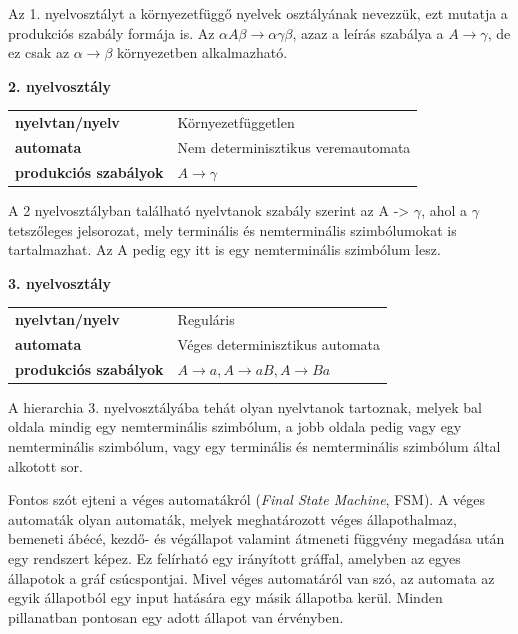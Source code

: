 \medskip

Az 1. nyelvosztályt a környezetfüggő nyelvek osztályának nevezzük, ezt mutatja a produkciós szabály formája is.
Az $\alpha A \beta \rightarrow \alpha \gamma \beta$, azaz a leírás szabálya a $A \rightarrow \gamma$, de ez csak az $\alpha \rightarrow \beta$ környezetben alkalmazható.

\bigskip

\noindent \textbf{2. nyelvosztály}

\medskip

\begin{tabular}{ll}
\textbf{nyelvtan/nyelv} & Környezetfüggetlen \\
\textbf{automata} & Nem determinisztikus veremautomata \\
\textbf{produkciós szabályok} & $A \rightarrow \gamma$ \\
\end{tabular}

\medskip

A 2 nyelvosztályban található nyelvtanok szabály szerint az A -> $\gamma$, ahol a $\gamma$ tetszőleges jelsorozat, mely terminális és nemterminális szimbólumokat is tartalmazhat. Az A pedig egy itt is egy nemterminális szimbólum lesz.

\bigskip

\noindent \textbf{3. nyelvosztály}

\medskip

\begin{tabular}{ll}
\textbf{nyelvtan/nyelv} & Reguláris \\
\textbf{automata} & Véges determinisztikus automata \\
\textbf{produkciós szabályok} & $A \rightarrow a, A \rightarrow aB, A \rightarrow Ba$ \\
\end{tabular}

\medskip

A hierarchia 3. nyelvosztályába tehát olyan nyelvtanok tartoznak, melyek bal oldala mindig egy nemterminális szimbólum, a jobb oldala pedig vagy egy nemterminális szimbólum, vagy egy terminális és nemterminális szimbólum által alkotott sor.


Fontos szót ejteni a véges automatákról (\textit{Final State Machine}, FSM). A véges automaták olyan automaták, melyek meghatározott véges állapothalmaz, bemeneti ábécé, kezdő- és végállapot valamint átmeneti függvény megadása után egy rendszert képez. Ez felírható egy irányított gráffal, amelyben az egyes állapotok a gráf csúcspontjai. Mivel véges automatáról van szó, az automata az egyik állapotból egy input hatására egy másik állapotba kerül. Minden pillanatban pontosan egy adott állapot van érvényben.

